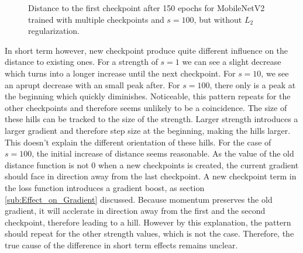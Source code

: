 \begin{figure}[h]
    \begin{center}
        \caption{Distance to the first checkpoint after 150 epochs for MobileNetV2 trained with multiple checkpoints and $s=100$, but without $L_2$ regularization.}
        \label{fig:Noreg}
    \end{center}
\end{figure}

In short term however, new checkpoint produce quite different influence on the
distance to existing ones. For a strength of $s=1$ we can see a slight decrease
which turns into a longer increase until the next checkpoint. For $s=10$, we see
an aprupt decrease with an small peak after. For $s=100$, there only is a peak
at the beginning which quickly diminishes. Noticeable, this pattern repeats for
the other checkpoints and therefore seems unlikely to be a coincidence. The size
of these hills can be tracked to the size of the strength. Larger strength
introduces a larger gradient and therefore step size at the beginning, making
the hills larger. This doesn't explain the different orientation of these hills.
For the case of $s=100$, the initial increase of distance seems reasonable. As
the value of the old distance function is not 0 when a new checkpoints is
created, the current gradient should face in direction away from the last
checkpoint. A new checkpoint term in the loss function introduces a gradient
boost, as section \ref{sub:Effect_on_Gradient} discussed. Because momentum
preserves the old gradient, it will acclerate in direction away from the first
and the second checkpoint, therefore leading to a hill. However by this
explanation, the pattern should repeat for the other strength values, which is
not the case. Therefore, the true cause of the difference in short term effects
remains unclear.



